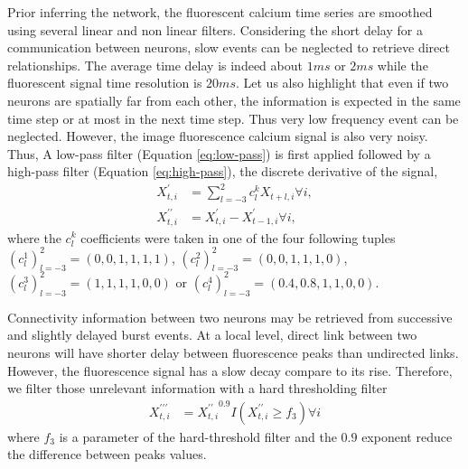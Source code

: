 \documentclass[wcp]{jmlr}
\begin{document}
Prior inferring the network, the fluorescent calcium time series
are smoothed using several linear and non linear filters.
Considering the short delay for a communication between neurons, slow events
can be neglected to retrieve direct relationships. The average time
delay is indeed about $1ms$ or $2ms$ while the fluorescent signal time
resolution is $20ms$. Let us also highlight that even if two neurons are
spatially far from each other, the information is expected in the same time
step or at most in the next time step. Thus very low frequency event can be neglected.
However, the image fluorescence calcium signal is also very noisy. Thus,
A low-pass filter (Equation \ref{eq:low-pass}) is first applied followed by a
high-pass filter (Equation \ref{eq:high-pass}), the discrete derivative of
the signal,
\begin{align}
X^\prime_{t,i} &= \sum_{l=-3}^2 c_l^k X_{t+l,i} \forall i, \label{eq:low-pass}\\
X^{\prime\prime}_{t,i} &= X^{\prime}_{t,i} - X^{\prime}_{t-1,i} \forall i, \label{eq:high-pass}
\end{align}
where the $c_l^k$ coefficients were taken in one of the four
following tuples
$\left(c_l^1\right)_{l=-3}^2=(0, 0, 1, 1, 1, 1)$,
$\left(c_l^2\right)_{l=-3}^2=(0, 0, 1, 1, 1, 0)$,
$\left(c_l^3\right)_{l=-3}^2=(1, 1, 1, 1, 0, 0)$ or
$\left(c_l^4\right)_{l=-3}^2=(0.4, 0.8, 1, 1, 0, 0)$.

Connectivity information between two neurons may be retrieved from successive
and slightly delayed burst events. At a local level, direct link
between two neurons will have shorter delay between fluorescence
peaks than undirected links. However, the fluorescence signal has a slow
decay compare to its rise. Therefore, we filter those unrelevant information
with a hard thresholding filter
\begin{align}
X^{\prime\prime\prime}_{t,i} &=
{X^{\prime\prime}_{t,i}}^{0.9} I(X^{\prime\prime}_{t,i} \geq f_3) \forall i
\label{eq:hard-treshold-filter}
\end{align}
where $f_3$ is a parameter of the hard-threshold filter and the $0.9$
exponent reduce the difference between peaks values.
\end{document}
